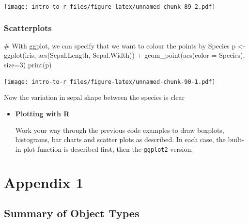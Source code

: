 \documentclass[a4paper]{book}
\newenvironment{Shaded}{}{}
\newcommand{\KeywordTok}[1]{\textcolor[rgb]{0.00,0.00,1.00}{{#1}}}
\newcommand{\DataTypeTok}[1]{{#1}}
\newcommand{\DecValTok}[1]{{#1}}
\newcommand{\StringTok}[1]{\textcolor[rgb]{0.00,0.50,0.50}{{#1}}}
\newcommand{\CommentTok}[1]{\textcolor[rgb]{0.00,0.50,0.00}{{#1}}}
\newcommand{\NormalTok}[1]{{#1}}
\newlength{\leftbarwidth}
\newlength{\leftbarsep}
\newcommand*{\leftbarcolorcmd}{\color{darkgray}}%
\renewenvironment{leftbar}{%
    \def\FrameCommand{{\leftbarcolorcmd{\vrule width \leftbarwidth\relax\hspace {\leftbarsep}}}}%
    \MakeFramed {\advance \hsize -\width \FrameRestore }%
}{%
    \endMakeFramed
}
\renewenvironment{Shaded}
{\vspace{0em}\begin{leftbar}\begin{snugshade}}
{\end{snugshade}\end{leftbar}\vspace{0pt}}
\newenvironment{rmdblock}[1]
  {\vspace{1.5em}\begin{shaded*}
  \begin{itemize}
  \renewcommand{\labelitemi}{
    \raisebox{-.7\height}[0pt][0pt]{
      {\setkeys{Gin}{width=3em,keepaspectratio}\texttt{[image: images/\#1]}}
    }
  }
  \item
  }
  {
  \end{itemize}
  \end{shaded*}
  }
\newenvironment{rmdexercise}
  {\begin{rmdblock}{exercise}}
  {\end{rmdblock}}
\begin{document}
\texttt{[image: intro-to-r\_files/figure-latex/unnamed-chunk-89-2.pdf]}

\subsection{Scatterplots}\label{scatterplots-1}

\begin{Shaded}
\begin{Highlighting}[]
\CommentTok{# With ggplot, we can specify that we want to colour the points by Species}
\NormalTok{p <-}\StringTok{ }\KeywordTok{ggplot}\NormalTok{(iris, }\KeywordTok{aes}\NormalTok{(Sepal.Length, Sepal.Width)) +}\StringTok{ }
\StringTok{  }\KeywordTok{geom_point}\NormalTok{(}\KeywordTok{aes}\NormalTok{(}\DataTypeTok{color =} \NormalTok{Species), }\DataTypeTok{size=}\DecValTok{3}\NormalTok{)}
\KeywordTok{print}\NormalTok{(p)}
\end{Highlighting}
\end{Shaded}

\texttt{[image: intro-to-r\_files/figure-latex/unnamed-chunk-90-1.pdf]}

Now the variation in sepal shape between the species is clear

\begin{rmdexercise}
\textbf{Plotting with R}

Work your way through the previous code examples to draw boxplots,
histograms, bar charts and scatter plots as described. In each case, the
built-in plot function is described first, then the \texttt{ggplot2}
version.
\end{rmdexercise}

\chapter*{Appendix 1}\label{appendix-1}

\section*{Summary of Object Types}\label{summary-of-object-types}
\end{document}
